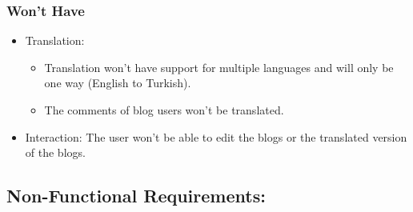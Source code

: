 \noindent \subsubsection*{Won't Have}
\begin{itemize}
\item Translation: 
\begin{itemize}
    \item Translation won't have support for multiple languages and will only be one way (English to Turkish).
    \item The comments of blog users won't be translated.
\end{itemize}
\item Interaction: The user won't be able to edit the blogs or the translated version of the blogs.
\end{itemize}


\subsection{Non-Functional Requirements:}

